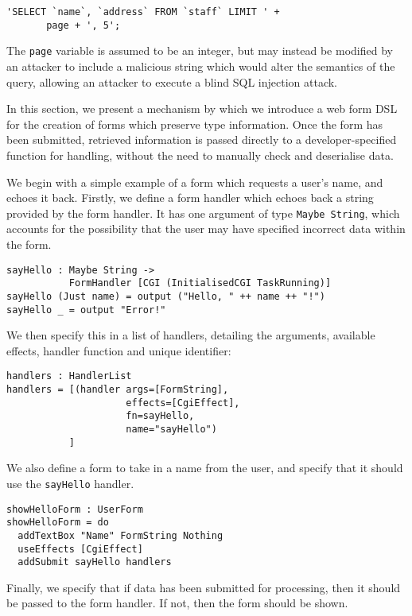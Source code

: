 \documentclass[preprint]{sigplanconf}
\begin{document}
\begin{Verbatim}
'SELECT `name`, `address` FROM `staff` LIMIT ' + 
       page + ', 5';
\end{Verbatim}
The \texttt{page} variable is assumed to be an integer, but may instead be modified by an attacker to include a malicious string which would alter the semantics of the query, allowing an attacker to execute a blind SQL injection attack. %

In this section, we present a mechanism by which we introduce a web form DSL for the creation of forms which preserve type information. Once the form has been submitted, retrieved information is passed directly to a developer-specified function for handling, without the need to manually check and deserialise data. 

We begin with a simple example of a form which requests a user's name, and echoes it back. Firstly, we define a form handler which echoes back a string provided by the form handler. It has one argument of type \texttt{Maybe String}, which accounts for the possibility that the user may have specified incorrect data within the form.

\begin{Verbatim}
sayHello : Maybe String -> 
           FormHandler [CGI (InitialisedCGI TaskRunning)]
sayHello (Just name) = output ("Hello, " ++ name ++ "!")
sayHello _ = output "Error!"
\end{Verbatim}

We then specify this in a list of handlers, detailing the arguments, available effects, handler function and unique identifier:

\begin{Verbatim}
handlers : HandlerList
handlers = [(handler args=[FormString], 
                     effects=[CgiEffect], 
                     fn=sayHello, 
                     name="sayHello")
           ]
\end{Verbatim}

We also define a form to take in a name from the user, and specify that it should use the \texttt{sayHello} handler.

\begin{Verbatim}
showHelloForm : UserForm
showHelloForm = do
  addTextBox "Name" FormString Nothing
  useEffects [CgiEffect]
  addSubmit sayHello handlers
\end{Verbatim}

Finally, we specify that if data has been submitted for processing, then it should be passed to the form handler. If not, then the form should be shown.
\end{document}
